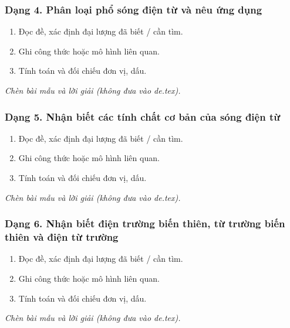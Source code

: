 \subsubsection{Dạng 4. Phân loại phổ sóng điện từ và nêu ứng dụng}
\begin{phuongphap}
\begin{enumerate}
\item Đọc đề, xác định đại lượng đã biết / cần tìm.
\item Ghi công thức hoặc mô hình liên quan.
\item Tính toán và đối chiếu đơn vị, dấu.
\end{enumerate}
\end{phuongphap}
\begin{vidumau}
\textit{Chèn bài mẫu và lời giải (không đưa vào de.tex).}
\end{vidumau}

\subsubsection{Dạng 5. Nhận biết các tính chất cơ bản của sóng điện từ}
\begin{phuongphap}
\begin{enumerate}
\item Đọc đề, xác định đại lượng đã biết / cần tìm.
\item Ghi công thức hoặc mô hình liên quan.
\item Tính toán và đối chiếu đơn vị, dấu.
\end{enumerate}
\end{phuongphap}
\begin{vidumau}
\textit{Chèn bài mẫu và lời giải (không đưa vào de.tex).}
\end{vidumau}

\subsubsection{Dạng 6. Nhận biết điện trường biến thiên, từ trường biến thiên và điện từ trường}
\begin{phuongphap}
\begin{enumerate}
\item Đọc đề, xác định đại lượng đã biết / cần tìm.
\item Ghi công thức hoặc mô hình liên quan.
\item Tính toán và đối chiếu đơn vị, dấu.
\end{enumerate}
\end{phuongphap}
\begin{vidumau}
\textit{Chèn bài mẫu và lời giải (không đưa vào de.tex).}
\end{vidumau}

